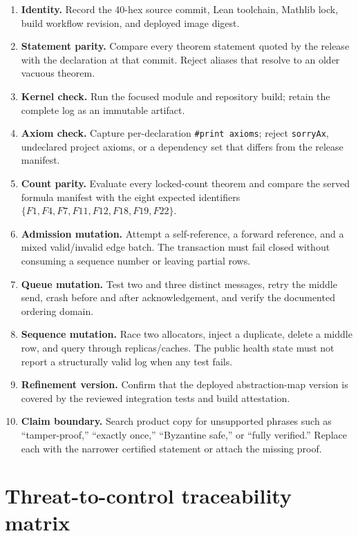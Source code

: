 \documentclass[11pt,letterpaper]{article}
\theoremstyle{definition}
\begin{document}
\begin{enumerate}
\item \textbf{Identity.} Record the 40-hex source commit, Lean toolchain, Mathlib
lock, build workflow revision, and deployed image digest.
\item \textbf{Statement parity.} Compare every theorem statement quoted by the
release with the declaration at that commit. Reject aliases that resolve to an
older vacuous theorem.
\item \textbf{Kernel check.} Run the focused module and repository build; retain
the complete log as an immutable artifact.
\item \textbf{Axiom check.} Capture per-declaration \texttt{\#print axioms};
reject \texttt{sorryAx}, undeclared project axioms, or a dependency set that
differs from the release manifest.
\item \textbf{Count parity.} Evaluate every locked-count theorem and compare the
served formula manifest with the eight expected identifiers
$\{F1,F4,F7,F11,F12,F18,F19,F22\}$.
\item \textbf{Admission mutation.} Attempt a self-reference, a forward
reference, and a mixed valid/invalid edge batch. The transaction must fail
closed without consuming a sequence number or leaving partial rows.
\item \textbf{Queue mutation.} Test two and three distinct messages, retry the
middle send, crash before and after acknowledgement, and verify the documented
ordering domain.
\item \textbf{Sequence mutation.} Race two allocators, inject a duplicate,
delete a middle row, and query through replicas/caches. The public health state
must not report a structurally valid log when any test fails.
\item \textbf{Refinement version.} Confirm that the deployed abstraction-map
version is covered by the reviewed integration tests and build attestation.
\item \textbf{Claim boundary.} Search product copy for unsupported phrases such
as ``tamper-proof,'' ``exactly once,'' ``Byzantine safe,'' or ``fully verified.''
Replace each with the narrower certified statement or attach the missing proof.
\end{enumerate}

\section{Threat-to-control traceability matrix}
\label{app:trace}
\end{document}

